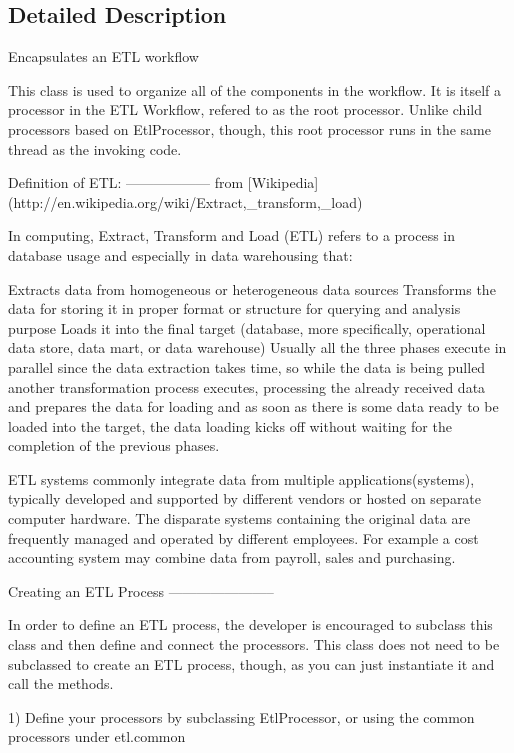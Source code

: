 \subsection{Detailed Description}
\begin{DoxyVerb}Encapsulates an ETL workflow

This class is used to organize all of the components in the workflow.
It is itself a processor in the ETL Workflow, refered to as the root
processor.  Unlike child processors based on EtlProcessor, though,
this root processor runs in the same thread as the invoking code.

Definition of ETL:
------------------
from [Wikipedia](http://en.wikipedia.org/wiki/Extract,_transform,_load)

In computing, Extract, Transform and Load (ETL) refers to a process in
database usage and especially in data warehousing that:

Extracts data from homogeneous or heterogeneous data sources Transforms the
data for storing it in proper format or structure for querying and analysis
purpose Loads it into the final target (database, more specifically,
operational data store, data mart, or data warehouse) Usually all the three
phases execute in parallel since the data extraction takes time, so while
the data is being pulled another transformation process executes, processing
the already received data and prepares the data for loading and as soon as
there is some data ready to be loaded into the target, the data loading
kicks off without waiting for the completion of the previous phases.

ETL systems commonly integrate data from multiple applications(systems),
typically developed and supported by different vendors or hosted on separate
computer hardware. The disparate systems containing the original data are
frequently managed and operated by different employees. For example a cost
accounting system may combine data from payroll, sales and purchasing.


Creating an ETL Process
-----------------------

In order to define an ETL process, the developer is encouraged to
subclass this class and then define and connect the processors.
This class does not need to be subclassed to create an ETL process,
though, as you can just instantiate it and call the methods.

 1) Define your processors by subclassing EtlProcessor, or using the
    common processors under etl.common


\end{DoxyVerb}
